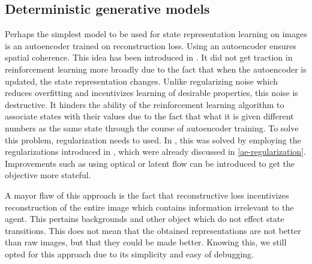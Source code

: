 \subsection{Deterministic generative models}
Perhaps the simplest model to be used for state representation learning on images is 
an autoencoder trained on reconstruction loss.
Using an autoencoder ensures spatial coherence.
This idea has been introduced in \cite{lange2010deep}.
It did not get traction in reinforcement learning more broadly due to the fact
that when the autoencoder is updated, the state representation changes.
Unlike regularizing noise which reduces overfitting and incentivizes learning of
desirable properties, this noise is destructive. It hinders the ability 
of the reinforcement learning algorithm to associate states with their values
due to the fact that what it is given different numbers as the same state 
through the course of autoencoder training.
To solve this problem, regularization needs to used.
In \cite{sac+ae}, this was solved by employing the regularizations
introduced in \cite{ghosh2019variational}, which were already discussed in \ref{ae-regularization}.
Improvements such as using optical or latent flow \cite{flow} can be introduced
to get the objective more stateful.

A mayor flaw of this approach is the fact that reconstructive loss
incentivizes reconstruction of the entire image which contains information
irrelevant to the agent. This pertains backgrounds and other object which do not effect
state transitions. This does not mean that the obtained representations are not better
than raw images, but that they could be made better.
Knowing this, we still opted for this approach due to its simplicity and easy of debugging.

